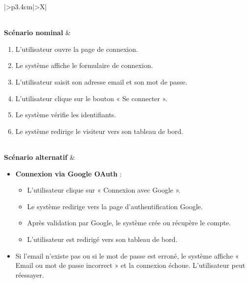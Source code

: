 \documentclass[a4paper,12pt]{report}
\begin{document}
\begin{table}[H]
\begin{tabularx}{\textwidth}{|>{\RaggedRight\arraybackslash}p{3.4cm}|>{\RaggedRight\arraybackslash}X|}
\begin{minipage}[t]{\linewidth}
\begin{itemize}[leftmargin=*, topsep=0pt, itemsep=1pt]
\end{itemize}
\vspace{2pt}
\end{minipage} \\
\hline
\textbf{Scénario nominal} &
\begin{minipage}[t]{\linewidth}
\vspace{2pt}
\begin{enumerate}[label=\arabic*., leftmargin=*, topsep=0pt, itemsep=1pt]
    \item L'utilisateur ouvre la page de connexion.
    \item Le système affiche le formulaire de connexion.
    \item L'utilisateur saisit son adresse email et son mot de passe. 
    \item L'utilisateur clique sur le bouton « Se connecter ».
    \item Le système vérifie les identifiants.
    \item Le système redirige le visiteur vers son tableau de bord.
\end{enumerate}
\vspace{2pt}
\end{minipage} \\
\hline
\textbf{Scénario alternatif} &
\begin{minipage}[t]{\linewidth}
\vspace{2pt}
\begin{itemize}[leftmargin=*, topsep=0pt, itemsep=1pt]
    \item \textbf{Connexion via Google OAuth} :
    \begin{itemize}[leftmargin=*, topsep=1pt, itemsep=1pt]
        \item L'utilisateur clique sur « Connexion avec Google ».
        \item Le système redirige vers la page d'authentification Google.
        \item Après validation par Google, le système crée ou récupère le compte.
        \item L'utilisateur est redirigé vers son tableau de bord.
    \end{itemize}
    \item  Si l'email n'existe pas ou si le mot de passe est erroné, le système affiche « Email ou mot de passe incorrect » et la connexion échoue. L'utilisateur peut réessayer.
\end{itemize}
\vspace{2pt}
\end{minipage} \\
\hline
\end{tabularx}
\end{table}
\end{document}
